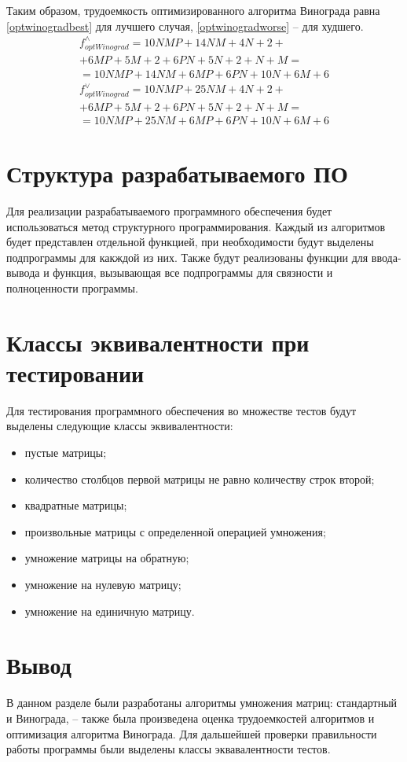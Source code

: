 Таким образом, трудоемкость оптимизированного алгоритма Винограда равна
\ref{optwinogradbest} для лучшего случая, \ref{optwinogradworse} -- для
худшего.
    \begin{multline}\label{optwinogradbest}
        f_{optWinograd}^{\wedge} = 10NMP + 14NM + 4N + 2 + \\
                                + 6MP + 5M + 2
                                + 6PN + 5N + 2 + N + M = \\
                                = 10NMP + 14NM + 6MP
                                + 6PN + 10N + 6M + 6
    \end{multline}
    \begin{multline}\label{optwinogradworse}
        f_{optWinograd}^{\vee} = 10NMP + 25NM + 4N + 2 + \\
                              + 6MP + 5M + 2
                              + 6PN + 5N + 2 + N + M = \\
                              = 10NMP + 25NM + 6MP
                              + 6PN + 10N + 6M + 6
    \end{multline}

\section{Структура разрабатываемого ПО}

Для реализации разрабатываемого программного обеспечения будет использоваться
метод структурного программирования. Каждый из алгоритмов будет представлен
отдельной функцией, при необходимости будут выделены подпрограммы для какждой
из них. Также будут реализованы функции для ввода-вывода
и функция, вызывающая все подпрограммы для связности и полноценности
программы.

\section{Классы эквивалентности при тестировании}

Для тестирования программного обеспечения во множестве тестов будут выделены
следующие классы эквивалентности:
\begin{itemize}[left=\parindent]
    \item пустые матрицы;
    \item количество столбцов первой матрицы не равно количеству строк второй;
    \item квадратные матрицы;
    \item произвольные матрицы с определенной операцией умножения;
    \item умножение матрицы на обратную;
    \item умножение на нулевую матрицу;
    \item умножение на единичную матрицу.
\end{itemize}

\section{Вывод}

В данном разделе были разработаны алгоритмы умножения матриц: стандартный и Винограда, -- также была произведена оценка трудоемкостей алгоритмов и оптимизация алгоритма Винограда. Для дальшейшей проверки правильности работы программы были выделены классы эквавалентности тестов.
